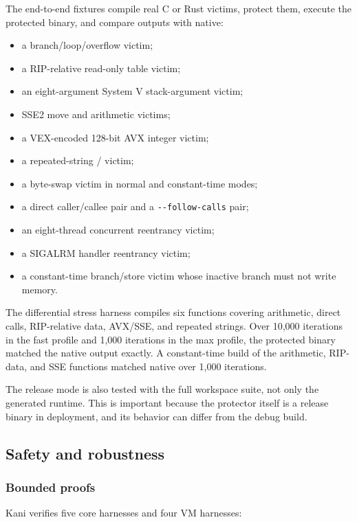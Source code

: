 The end-to-end fixtures compile real C or Rust victims, protect them, execute the
protected binary, and compare outputs with native:

\begin{itemize}
  \item a branch/loop/overflow victim;
  \item a RIP-relative read-only table victim;
  \item an eight-argument System V stack-argument victim;
  \item SSE2 move and arithmetic victims;
  \item a VEX-encoded 128-bit AVX integer victim;
  \item a repeated-string / victim;
  \item a byte-swap victim in normal and constant-time modes;
  \item a direct caller/callee pair and a \verb|--follow-calls| pair;
  \item an eight-thread concurrent reentrancy victim;
  \item a SIGALRM handler reentrancy victim;
  \item a constant-time branch/store victim whose inactive branch must not write
        memory.
\end{itemize}

The differential stress harness compiles six functions covering arithmetic,
direct calls, RIP-relative data, AVX/SSE, and repeated strings. Over 10,000
iterations in the fast profile and 1,000 iterations in the max profile, the
protected binary matched the native output exactly. A constant-time build of the
arithmetic, RIP-data, and SSE functions matched native over 1,000 iterations.

The release mode is also tested with the full workspace suite, not only the
generated runtime. This is important because the protector itself is a release
binary in deployment, and its behavior can differ from the debug build.

\subsection{Safety and robustness}

\subsubsection{Bounded proofs}

Kani verifies five core harnesses and four VM harnesses:


